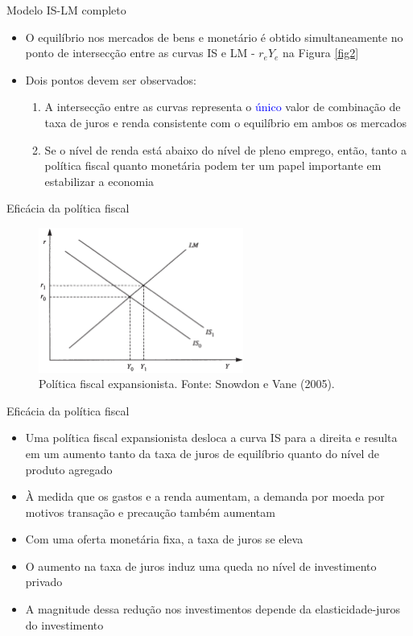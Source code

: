 \documentclass[10pt]{beamer}
\begin{document}
\begin{frame}{Modelo IS-LM completo}
    \begin{itemize}
        \item O equilíbrio nos mercados de bens e monetário é obtido simultaneamente no ponto de intersecção entre as curvas IS e LM - $r_eY_e$ na Figura \ref{fig2}
        \bigskip
        \item Dois pontos devem ser observados:
        \bigskip
        \begin{enumerate}
        \item A intersecção entre as curvas representa o \textcolor{blue}{único} valor de combinação de taxa de juros e renda consistente com o equilíbrio em ambos os mercados
        \medskip
        \item Se o nível de renda está abaixo do nível de pleno emprego, então, tanto a política fiscal quanto monetária podem ter um papel importante em estabilizar a economia
        \end{enumerate}
    \end{itemize}
\end{frame}

\begin{frame}{Eficácia da política fiscal}
    \begin{figure}
        \centering
        \includegraphics[width=0.6\textwidth]{./figures/aula06_fig3.PNG}
        \caption{Política fiscal expansionista. Fonte: Snowdon e Vane (2005).}
        \label{fig3}
    \end{figure}
\end{frame}

\begin{frame}{Eficácia da política fiscal}
    \begin{itemize}
        \item Uma política fiscal expansionista desloca a curva IS para a direita e resulta em um aumento tanto da taxa de juros de equilíbrio quanto do nível de produto agregado
        \bigskip
        \item À medida que os gastos e a renda aumentam, a demanda por moeda por motivos transação e precaução também aumentam
        \bigskip
        \item Com uma oferta monetária fixa, a taxa de juros se eleva
        \bigskip
        \item O aumento na taxa de juros induz uma queda no nível de investimento privado
        \bigskip
        \item A magnitude dessa redução nos investimentos depende da elasticidade-juros do investimento
    \end{itemize}
\end{frame}
\end{document}
